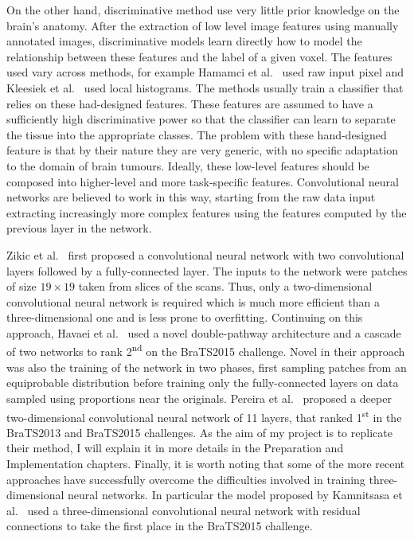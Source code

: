\documentclass[12pt,a4paper,twoside,openright]{report}
\begin{document}
On the other hand, discriminative method use very little prior knowledge on the brain's anatomy. After the extraction of low level image features using manually annotated images, discriminative models learn directly how to model the relationship between these features and the label of a given voxel. The features used vary across methods, for example Hamamci et al.\ \cite{hamamci} used raw input pixel and Kleesiek et al.\ \cite{kleesiek} used local histograms. The methods usually train a classifier that relies on these had-designed features. These features are assumed to have a sufficiently high discriminative power so that the classifier can learn to separate the tissue into the appropriate classes. The problem with these hand-designed feature is that by their nature they are very generic, with no specific adaptation to the domain of brain tumours. Ideally, these low-level features should be composed into higher-level and more task-specific features. Convolutional neural networks are believed to work in this way, starting from the raw data input extracting increasingly more complex features using the features computed by the previous layer in the network.

Zikic et al.\ \cite{zikic} first proposed a convolutional neural network with two convolutional layers followed by a fully-connected layer. The inputs to the network were patches of size $19 \times 19$ taken from slices of the scans. Thus, only a two-dimensional convolutional neural network is required which is much more efficient than a three-dimensional one and is less prone to overfitting. Continuing on this approach, Havaei et al.\ \cite{havaei} used a novel double-pathway architecture and a cascade of two networks to rank 2\textsuperscript{nd} on the BraTS2015 challenge. Novel in their approach was also the training of the network in two phases, first sampling patches from an equiprobable distribution before training only the fully-connected layers on data sampled using proportions near the originals. Pereira et al.\ \cite{pereira} proposed a deeper two-dimensional convolutional neural network of 11 layers, that ranked 1\textsuperscript{st} in the BraTS2013 and BraTS2015 challenges. As the aim of my project is to replicate their method, I will explain it in more details in the Preparation and Implementation chapters. Finally, it is worth noting that some of the more recent approaches have successfully overcome the difficulties involved in training three-dimensional neural networks. In particular the model proposed by Kamnitsasa et al.\ \cite{kamnitsas} used a three-dimensional convolutional neural network with residual connections \cite{resnet} to take the first place in the BraTS2015 challenge.
\end{document}
